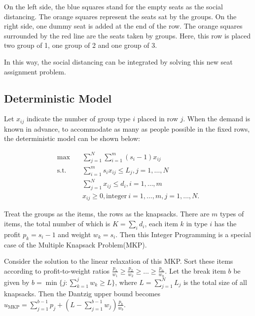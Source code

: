 On the left side, the blue squares stand for the empty seats as the social distancing. The orange squares represent the seats sat by the groups. 
On the right side, one dummy seat is added at the end of the row. The orange squares surrounded by the red line are the seats taken by groups. Here, this row is placed two group of 1, one group of 2 and one group of 3.

In this way, the social distancing can be integrated by solving this new seat assignment problem.


\subsection{Deterministic Model}
Let $x_{ij}$ indicate the number of group type $i$ placed in row $j$. When the demand is known in advance, to accommodate as many as people possible in the fixed rows, the deterministic model can be shown below:

\begin{equation}\label{deter_upper}
    \begin{aligned}
      \max \quad & \sum_{j =1}^{N} \sum_{i = 1}^{m} (s_i -1) x_{ij} \\
      \text {s.t.} \quad & \sum_{i = 1}^{m} s_i x_{ij} \leq L_{j}, j=1,\ldots,N \\
      & \sum_{j =1}^{N} x_{ij} \leq d_{i}, i=1,\ldots,m \\
      & x_{ij} \geq 0, \text{integer}~ i=1,\ldots,m, j=1,\ldots,N.
    \end{aligned}
\end{equation}

Treat the groups as the items, the rows as the knapsacks. There are $m$ types of items, the total number of which is $K = \sum_{i} d_i$, each item $k$ in type $i$ has the profit $p_k = s_i-1$ and weight $w_k = s_i$. Then this Integer Programming is a special case of the Multiple Knapsack Problem(MKP).

Consider the solution to the linear relaxation of this MKP. Sort these items according to profit-to-weight ratios $\frac{p_1}{w_1} \geq \frac{p_2}{w_2} \geq \ldots \geq \frac{p_n}{w_n}$.
Let the break item $b$ be given by $b=\min \{j: \sum_{k=1}^j w_k \geq L\}$, where $L = \sum_{j=1}^{N} L_j$ is the total size of all knapsacks. Then the Dantzig upper bound \cite{dantzig1957discrete} becomes 
$u_{\mathrm{MKP}}=\sum_{j=1}^{b-1} p_j+\left(L-\sum_{j=1}^{b-1} w_j\right) \frac{p_b}{w_b}$. 

